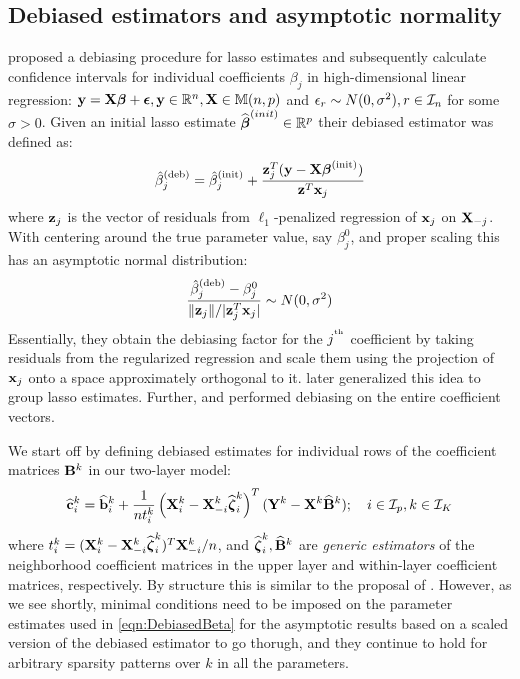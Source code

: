 \subsection{Debiased estimators and asymptotic normality}
\label{sec:testing-subsec-1}
\cite{ZhangZhang14} proposed a debiasing procedure for lasso estimates and subsequently calculate confidence intervals for individual coefficients $\beta_j$ in high-dimensional linear regression: ${\bf{y}} = {\mathbf{X}} {\boldsymbol{\beta}} + {\boldsymbol{\epsilon}}, {\bf{y}} \in {\mathbb{R}}^n, {\mathbf{X}} \in {\mathbb{M}}(n,p)$ and $\epsilon_r \sim N(0,\sigma^2), r \in {\cal{I}}_n$ for some $\sigma>0$. Given an initial lasso estimate $\widehat {{\boldsymbol{\beta}}}^{(init)} \in {\mathbb{R}}^p$ their debiased estimator was defined as:
%
$$
\hat \beta_j^{(\text{deb})} = \hat \beta_j^{(\text{init})} + \frac{{\bf{z}}_j^T ( {\bf{y}} - {\mathbf{X}} {\boldsymbol{\beta}}^{(\text{init})})}{{\bf{z}}^T {\bf{x}}_j}
$$
%
where ${\bf{z}}_j$ is the vector of residuals from $\ell_1$-penalized regression of ${\bf{x}}_j$ on ${\mathbf{X}}_{-j}$. With centering around the true parameter value, say $\beta_j^0$, and proper scaling this has an asymptotic normal distribution:
%
$$
\frac{\hat \beta_j^{(\text{deb})} - \beta_j^0}{\| {\bf{z}}_j \|/| {\bf{z}}_j^T {\bf{x}}_j |} \sim N(0, \sigma^2)
$$
%
Essentially, they obtain the debiasing factor for the $j^{\operatorname*{^{\text{th}}}}$ coefficient by taking residuals from the regularized regression and scale them using the projection of ${\bf{x}}_j$ onto a space approximately orthogonal to it. \cite{MitraZhang16} later generalized this idea to group lasso estimates. Further, \cite{vanDeGeerEtal14} and \cite{JavanmardMontanari14} performed debiasing on the entire coefficient vectors.

We start off by defining debiased estimates for individual rows of the coefficient matrices ${\mathbf{B}}^k$ in our two-layer model:
%
\begin{align}\label{eqn:DebiasedBeta}
\widehat {{\bf{c}}}_i^k = \widehat {{\bf{b}}}_i^k + \frac{1}{n t_i^k} \left( {\mathbf{X}}_i^k - {\mathbf{X}}_{-i}^k \widehat {{\boldsymbol{\zeta}}}_i^k \right)^T ({\mathbf{Y}}^k - {\mathbf{X}}^k \widehat {{\mathbf{B}}}^k )
; \quad i \in {\cal{I}}_p, k \in {\cal{I}}_K
\end{align}
%
where $t_i^k = ( {\mathbf{X}}_i^k - {\mathbf{X}}_{-i}^k \widehat {{\boldsymbol{\zeta}}}_i^k )^T {\mathbf{X}}_{-i}^k/n$, and $\widehat {{\boldsymbol{\zeta}}}_i^k, \widehat {{\mathbf{B}}}^k$ are {\it generic estimators} of the neighborhood coefficient matrices in the upper layer and within-layer coefficient matrices, respectively. By structure this is similar to the proposal of \cite{ZhangZhang14}. However, as we see shortly, minimal conditions need to be imposed on the parameter estimates used in \eqref{eqn:DebiasedBeta} for the asymptotic results based on a scaled version of the debiased estimator to go thorugh, and they continue to hold for arbitrary sparsity patterns over $k$ in all the parameters.

